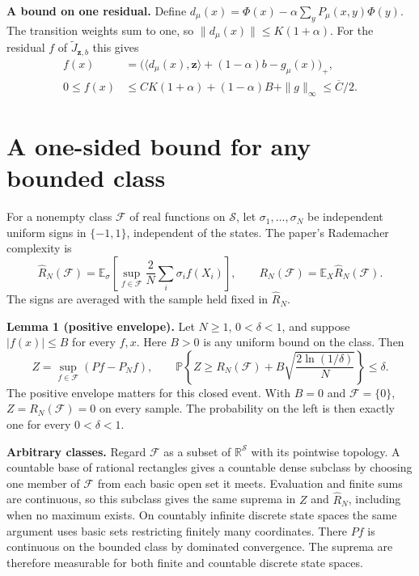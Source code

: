 \documentclass[12pt,a4paper]{article}
\newcommand{\R}{\mathbb R}
\newcommand{\E}{\mathbb E}
\newcommand{\Prob}{\mathbb P}
\newcommand{\F}{\mathcal F}
\newcommand{\Cbar}{\overline C}
\newcommand{\lead}[1]{\par\smallskip\noindent\textbf{#1}\enspace}
\begin{document}
\lead{A bound on one residual.}
Define \(d_\mu(x)=\Phi(x)-\alpha\sum_yP_\mu(x,y)\Phi(y)\). The transition
weights sum to one, so \(\|d_\mu(x)\|\le K(1+\alpha)\). For the residual
\(f\) of \(\widetilde J_{\mathbf z,b}\) this gives
\begin{equation}
 \begin{aligned}
 f(x)&=\bigl(\langle d_\mu(x),\mathbf z\rangle+(1-\alpha)b-g_\mu(x)\bigr)_+,\\
 0\le f(x)&\le CK(1+\alpha)+(1-\alpha)B+\|g\|_\infty\le \Cbar/2 .
 \end{aligned}
 \tag{1}\label{eq:residual}
\end{equation}

\newpage
\section*{A one-sided bound for any bounded class}
For a nonempty class \(\F\) of real functions on \(\mathcal S\), let
\(\sigma_1,\ldots,\sigma_N\) be independent uniform signs in \(\{-1,1\}\),
independent of the states. The paper's Rademacher complexity is
\[
 \widehat R_N(\F)=\E_\sigma\!\left[\sup_{f\in\F}\frac{2}{N}
          \sum_i\sigma_i f(X_i)\right],\qquad
 R_N(\F)=\E_X\widehat R_N(\F).
\]
The signs are averaged with the sample held fixed in \(\widehat R_N\).

\textbf{Lemma 1 (positive envelope).} Let \(N\ge1\), \(0<\delta<1\), and
suppose \(|f(x)|\le B\) for every \(f,x\). Here \(B>0\) is any uniform bound on the class. Then
\begin{equation}
 Z=\sup_{f\in\F}(P f-P_N f),\qquad
 \Prob\!\left\{Z\ge R_N(\F)+B\sqrt{\frac{2\ln(1/\delta)}{N}}\right\}\le\delta .
 \tag{2}\label{eq:lemma}
\end{equation}
The positive envelope matters for this closed event. With \(B=0\) and
\(\F=\{0\}\), \(Z=R_N(\F)=0\) on every sample. The probability on the
left is then exactly one for every \(0<\delta<1\).

\lead{Arbitrary classes.}
Regard \(\F\) as a subset of \(\R^{\mathcal S}\) with its pointwise topology.
A countable base of rational rectangles gives a countable dense subclass
by choosing one member of \(\F\) from each basic open set it meets.
Evaluation and finite sums are continuous, so this subclass gives the
same suprema in \(Z\) and \(\widehat R_N\), including when no maximum exists.
On countably infinite discrete state spaces the same argument uses basic
sets restricting finitely many coordinates. There \(P f\) is continuous
on the bounded class by dominated convergence. The suprema are therefore
measurable for both finite and countable discrete state spaces.
\end{document}
